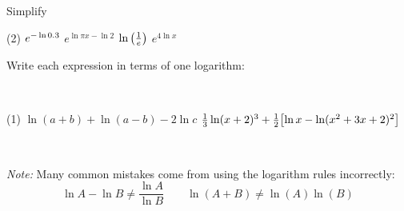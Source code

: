 \documentclass[mathNotesPreamble]{subfiles}
\begin{document}
  \begin{ex*}
    Simplify
  \end{ex*}
  \begin{extasks}[after-item-skip=\stretch{1}](2)
    \task $e\inv[\ln 0.3]$
    \task $e^{\ln \pi x-\ln 2}$
    \task $\ln\parens{\frac{1}{e}}$
    \task $e^{4\ln x}$
  \end{extasks}

  \pagebreak
  \begin{ex*}
    Write each expression in terms of one logarithm:
    
    \noindent
    \begin{minipage}[t]{0.55\linewidth}~
      \begin{extasks}[after-item-skip=2.25in](1)
        \task $\ln(a+b)+\ln(a-b)-2\ln c$
        \task $\frac{1}{3}\ln(x+2)^3 +\frac{1}{2}\sbrkt{\ln x-\ln(x^2+3x+2)^2}$
      \end{extasks}
    \end{minipage}%
    \begin{minipage}[t]{0.45\linewidth}~
      \begin{flushright}
      \end{flushright}
    \end{minipage}
  \end{ex*}

  \begin{thmBox*}
    \textit{Note:} Many common mistakes come from using the logarithm rules incorrectly:
      $$\ln A-\ln B\neq \dfrac{\ln A}{\ln B}\qquad \ln(A+B)\neq\ln(A)\ln(B)$$
  \end{thmBox*}
  \pagebreak
\end{document}
